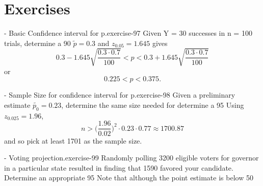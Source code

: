 \documentclass[10pt,]{book}
\numberwithin{equation}{section}
\newcommand{\lt}{<}
\newcommand{\gt}{>}
\begin{document}
\section[{Exercises}]{Exercises}\label{section-71}
\hypertarget{p-1428}{}%
\begin{inlineexercise}{- Basic Confidence interval for p.}{exercise-97}%
\hypertarget{p-1429}{}%
Given Y = 30 successes in n = 100 trials, determine a 90%
\hypertarget{p-1430}{}%
\(\tilde{p} = 0.3\) and \(z_{0.05} = 1.645\) gives%
\begin{equation*}
0.3 - 1.645 \sqrt{\frac{0.3 \cdot 0.7}{100}} \lt p \lt 0.3 + 1.645 \sqrt{\frac{0.3 \cdot 0.7}{100}}
\end{equation*}
or%
\begin{equation*}
0.225 \lt p \lt 0.375.
\end{equation*}
%
%
\end{inlineexercise}
 \begin{inlineexercise}{- Sample Size for confidence interval for p.}{exercise-98}%
\hypertarget{p-1431}{}%
Given a preliminary estimate \(\tilde{p_0} = 0.23\), determine the same size needed for determine a 95%
\hypertarget{p-1432}{}%
Using \(z_{0.025} = 1.96\),%
\begin{equation*}
n \gt \big ( \frac{1.96}{0.02} \big )^2 \cdot 0.23 \cdot 0.77 \approx 1700.87
\end{equation*}
and so pick at least 1701 as the sample size.%
%
\end{inlineexercise}
 \begin{inlineexercise}{- Voting projection.}{exercise-99}%
\hypertarget{p-1433}{}%
Randomly polling 3200 eligible voters for governor in a particular state resulted in finding that 1590 favored your candidate. Determine an appropriate 95%
\hypertarget{p-1434}{}%
Note that although the point estimate is below 50%
%
\end{inlineexercise}
\end{document}
